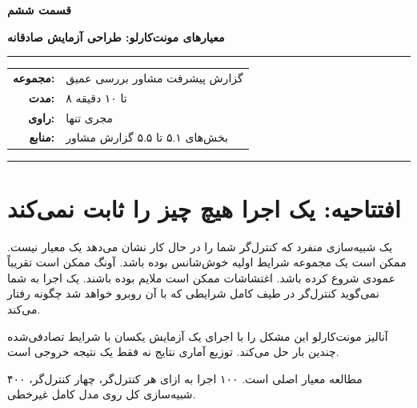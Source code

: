 \documentclass[12pt, a4paper]{article}
\newcommand{\dash}{\lr{---}}
\begin{document}

\thispagestyle{empty}

\vspace*{1.2cm}

{\centering
{\color{seriesblue}\fontsize{24}{30}\selectfont\bfseries قسمت ششم}

\vspace{0.5cm}
{\fontsize{15}{20}\selectfont\bfseries معيارهای مونت‌کارلو: طراحی آزمايش صادقانه}

\vspace{0.9cm}
{\color{seriesblue}\rule{0.55\linewidth}{1pt}}
\vspace{0.7cm}

{\normalsize
\begin{tabular}{rl}
  \textbf{مجموعه:}     & گزارش پيشرفت مشاور \dash{} بررسی عمیق \\[5pt]
  \textbf{مدت:}        & ۸ تا ۱۰ دقیقه \\[5pt]
  \textbf{راوی:}       & مجری تنها \\[5pt]
  \textbf{منابع:}      & بخش‌های ۵.۱ تا ۵.۵ گزارش مشاور \\
\end{tabular}
}

\vspace{0.9cm}
{\color{seriesblue}\rule{0.55\linewidth}{0.4pt}}
\par}

\vspace{1.2cm}

\section{افتتاحیه: يک اجرا هيچ چيز را ثابت نمی‌کند}

يک شبيه‌سازی منفرد که کنترل‌گر شما را در حال کار نشان می‌دهد يک معيار نيست. ممکن است يک مجموعه شرايط اوليه خوش‌شانس بوده باشد. آونگ ممکن است تقريباً عمودی شروع کرده باشد. اغتشاشات ممکن است ملايم بوده باشند. يک اجرا به شما نمی‌گويد کنترل‌گر در طيف کامل شرايطی که با آن روبرو خواهد شد چگونه رفتار می‌کند.

آناليز مونت‌کارلو اين مشکل را با اجرای يک آزمايش يکسان با شرايط تصادفی‌شده چندين بار حل می‌کند. توزيع آماری نتايج \dash{} نه فقط يک نتيجه \dash{} خروجی است.

مطالعه  معيار اصلی است. ۱۰۰ اجرا به ازای هر کنترل‌گر، چهار کنترل‌گر، ۴۰۰ شبيه‌سازی کل روی مدل کامل غيرخطی.
\end{document}
